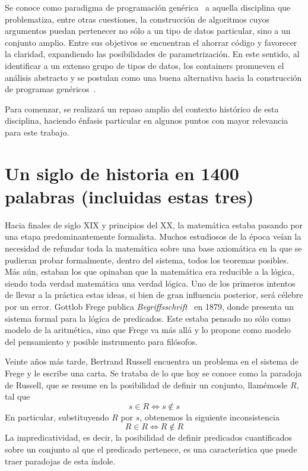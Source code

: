 Se conoce como paradigma de programación genérica~\cite{generic} a aquella disciplina que problematiza, entre otras cuestiones, la construcción de algoritmos cuyos argumentos puedan pertenecer no sólo a un tipo de datos particular, sino a un conjunto amplio. Entre sus objetivos se encuentran el ahorrar código y favorecer la claridad, expandiendo las posibilidades de parametrización. En este sentido, al identificar a un extenso grupo de tipos de datos, los containers promueven el análisis abstracto y se postulan como una buena alternativa hacia la construcción de programas genéricos~\cite{alti:2007}.

Para comenzar, se realizará un repaso amplio del contexto histórico de esta disciplina, haciendo énfasis particular en algunos puntos con mayor relevancia para este trabajo.

\section*{Un siglo de historia en 1400 palabras (incluidas estas tres)}%

Hacia finales de siglo XIX y principios del XX, la matemática estaba pasando por una etapa predominantemente formalista. Muchos estudiosos de la época veían la necesidad de refundar toda la matemática sobre una base axiomática en la que se pudieran probar formalmente, dentro del sistema, todos los teoremas posibles. Más aún, estaban los que opinaban que la matemática era reducible a la lógica, siendo toda verdad matemática una verdad lógica. Uno de los primeros intentos de llevar a la práctica estas ideas, si bien de gran influencia posterior, será célebre por un error. Gottlob Frege publica {\it Begriffsschrift}~ en 1879, donde presenta un sistema formal para la lógica de predicados. Este estaba pensado no sólo como modelo de la aritmética, sino que Frege va más allá y lo propone como modelo del pensamiento y posible instrumento para filósofos.

Veinte años más tarde, Bertrand Russell encuentra un problema en el sistema de Frege y le escribe una carta. Se trataba de lo que hoy se conoce como la paradoja de Russell, que se resume en la posibilidad de definir un conjunto, llamémosle $R$, tal que $$s \in R \Leftrightarrow s \notin s$$ En particular, substituyendo $R$ por $s$, obtenemos la siguiente inconsistencia $$R \in R \Leftrightarrow R \notin R$$
La impredicatividad, es decir, la posibilidad de definir predicados cuantificados sobre un conjunto al que el predicado pertenece, es una característica que puede traer paradojas de esta índole.

